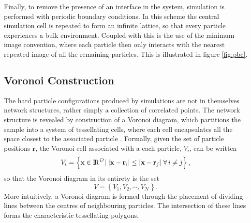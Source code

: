 Finally, to remove the presence of an interface in the system, simulation is performed with periodic boundary conditions.
In this scheme the central simulation cell is repeated to form an infinite lattice, so that every particle experiences a bulk environment.
Coupled with this is the use of the minimum image convention, where each particle then only interacts with the nearest repeated image of all the remaining particles.
This is illustrated in figure \ref{fig:pbc}.
 
\subsection{Voronoi Construction}
\label{s:voronoiintro}

The hard particle configurations produced by \mc{} simulations are not in themselves network structures, rather simply a collection of correlated points.
The network structure is revealed by construction of a Voronoi diagram, which partitions the sample into a system of tessellating cells, where each cell encapsulates all the space closest to the associated particle \cite{Okabe1992}.
Formally, given the set of particle positions $\mathbf{r}$, the Voronoi cell associated with a each particle, $V_i$, can be written
\begin{equation}
	V_i = \left\{\mathbf{x}\in {\rm I\!R}^D | \,\, \lvert\mathbf{x}-\mathbf{r}_{i}\rvert\leq \lvert\mathbf{x}-\mathbf{r}_{j}\rvert \,\, \forall \, i\neq j\right\},
\end{equation}
so that the Voronoi diagram in its entirety is the set
\begin{equation}
	V = \left\{V_1, V_2, \cdots, V_\mathcal{N}\right\}.
\end{equation} 
More intuitively, a Voronoi diagram is formed through the placement of dividing lines between the centres of neighbouring particles. 
The intersection of these lines forms the characteristic tessellating polygons.

